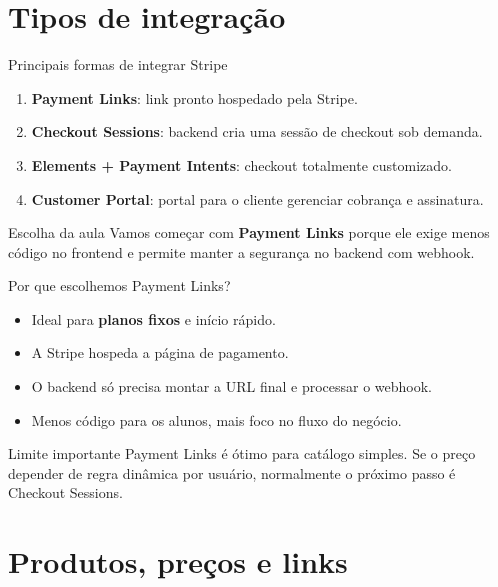 \documentclass[aspectratio=169]{beamer}
\begin{document}
\section{Tipos de integração}

\begin{frame}{Principais formas de integrar Stripe}
\begin{enumerate}
  \item \textbf{Payment Links}: link pronto hospedado pela Stripe.
  \item \textbf{Checkout Sessions}: backend cria uma sessão de checkout sob demanda.
  \item \textbf{Elements + Payment Intents}: checkout totalmente customizado.
  \item \textbf{Customer Portal}: portal para o cliente gerenciar cobrança e assinatura.
\end{enumerate}

\begin{alertblock}{Escolha da aula}
Vamos começar com \textbf{Payment Links} porque ele exige menos código no frontend e permite manter a segurança no backend com webhook.
\end{alertblock}
\end{frame}

\begin{frame}{Por que escolhemos Payment Links?}
\begin{itemize}
  \item Ideal para \textbf{planos fixos} e início rápido.
  \item A Stripe hospeda a página de pagamento.
  \item O backend só precisa montar a URL final e processar o webhook.
  \item Menos código para os alunos, mais foco no fluxo do negócio.
\end{itemize}

\begin{block}{Limite importante}
Payment Links é ótimo para catálogo simples. Se o preço depender de regra dinâmica por usuário, normalmente o próximo passo é Checkout Sessions.
\end{block}
\end{frame}

\section{Produtos, preços e links}
\end{document}
